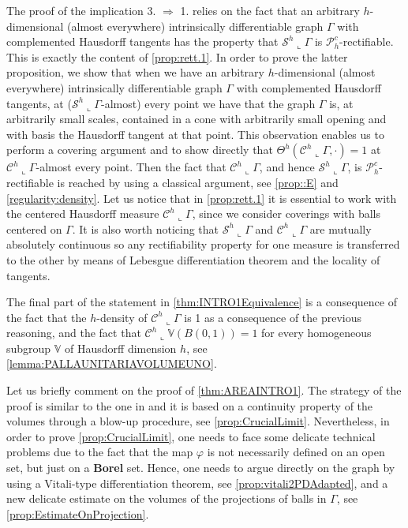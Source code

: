 \documentclass[10pt, a4paper,
oneside, headinclude,footinclude]{scrartcl}
\begin{document}
The proof of the implication 3. $\Rightarrow$ 1. relies on the fact that an arbitrary $h$-dimensional (almost everywhere) intrinsically differentiable graph $\Gamma$ with complemented Hausdorff tangents has the property that $\mathcal{S}^h\llcorner\Gamma$ is $\mathscr{P}_h^c$-rectifiable. This is exactly the content of \cref{prop:rett.1}. In order to prove the latter proposition, we show that when we have an arbitrary $h$-dimensional (almost everywhere) intrinsically differentiable graph $\Gamma$ with complemented Hausdorff tangents, at ($\mathcal{S}^h\llcorner\Gamma$-almost) every point we have that the graph $\Gamma$ is, at arbitrarily small scales, contained in a cone with arbitrarily small opening and with basis the Hausdorff tangent at that point. This observation enables us to perform a covering argument and to show directly that $\Theta^h(\mathcal{C}^h\llcorner\Gamma,\cdot)=1$ at $\mathcal{C}^h\llcorner\Gamma$-almost every point. Then the fact that $\mathcal{C}^h\llcorner\Gamma$, and hence $\mathcal{S}^h\llcorner\Gamma$, is $\mathscr{P}_h^c$-rectifiable is reached by using a classical argument, see \cref{prop::E} and \cref{regularity:density}. Let us notice that in \cref{prop:rett.1} it is essential to work with the centered Hausdorff measure $\mathcal{C}^h\llcorner\Gamma$, since we consider coverings with balls centered on $\Gamma$. It is also worth noticing that $\mathcal{S}^h\llcorner\Gamma$ and $\mathcal{C}^h\llcorner\Gamma$ are mutually absolutely continuous so any rectifiability property for one measure is transferred to the other by means of Lebesgue differentiation theorem and the locality of tangents.

The final part of the statement in \cref{thm:INTRO1Equivalence} is a consequence of the fact that the $h$-density of $\mathcal{C}^h\llcorner\Gamma$ is 1 as a consequence of the previous reasoning, and the fact that $\mathcal{C}^h\llcorner\mathbb V(B(0,1))=1$ for every homogeneous subgroup $\mathbb V$ of Hausdorff dimension $h$, see \cref{lemma:PALLAUNITARIAVOLUMEUNO}.

Let us briefly comment on the proof of \cref{thm:AREAINTRO1}. The strategy of the proof is similar to the one in \cite{JNGV20} and it is based on a continuity property of the volumes through a blow-up procedure, see \cref{prop:CrucialLimit}. Nevertheless, in order to prove \cref{prop:CrucialLimit}, one needs to face some delicate technical problems due to the fact that the map $\varphi$ is not necessarily defined on an open set, but just on a \textbf{Borel} set. Hence, one needs to argue directly on the graph by using a Vitali-type differentiation theorem, see \cref{prop:vitali2PDAdapted}, and a new delicate estimate on the volumes of the projections of balls in $\Gamma$, see \cref{prop:EstimateOnProjection}.
\end{document}
